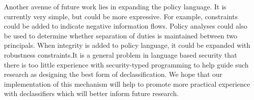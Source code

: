 Another avenue of future work lies in expanding the policy
language. It is currently very simple, but could be more expressive.
For example, constraints could be added to indicate negative information flows. Policy analyses could also be used to determine
whether separation of duties is maintained between two principals.
When integrity is added to policy language, it could be expanded with robustness constraints.It is a general problem in language based security that there is too little experience with security-typed
programming to help guide such research as designing the best
form of declassification. We hope that our implementation of this
mechanism will help to promote more practical experience
with declassifiers which will better inform future research.

